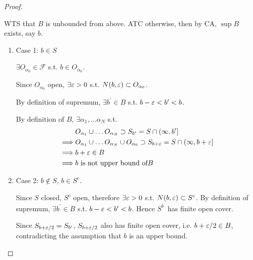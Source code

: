 \begin{proof}
\begin{enumerate}
        WTS that $B$ is unbounded from above. ATC otherwise, then by CA, 
        $\sup B$ exists, say $b$. 
        \begin{enumerate}
            \item Case 1: $b \in S$
            \medskip

            $\exists O_{\alpha_0} \in \mathcal{F}$ s.t. $b \in O_{\alpha_0}$. 
            \medskip 

            Since $O_{\alpha_0}$ open, $\exists \varepsilon > 0$ s.t. $N(b, \varepsilon) \subset O_{\alpha_0}$. 
            \medskip 

            By definition of supremum, $\exists b^{\prime} \in B$ s.t. $b - \varepsilon < b^{\prime} < b$. 
            \medskip 

            By definition of $B$, $\exists \alpha_1, \hdots \alpha_N$ s.t. 
            \begin{align*}
                & O_{\alpha_1} \cup \hdots O_{\alpha_N} \supset S_{b^{\prime}} = S \cap (\infty, b^{\prime}] \\
                \implies & O_{\alpha_1} \cup \hdots O_{\alpha_N} \cup O_{\alpha_0 } \supset S_{b + \varepsilon} = S \cap (\infty, b + \varepsilon] \\ 
                \implies & b + \varepsilon \in B \\
                \implies & b \text{ is not upper bound of} B
            \end{align*}

            \item Case 2: $b \notin S$, $b \in S^c$. 
            \medskip 

            Since $S$ closed, $S^c$ open, therefore $\exists \varepsilon > 0$ s.t. $N(b, \varepsilon) \subset S^c$. By definition of supremum, $\exists b^{\prime} \in B$ s.t. $b - \varepsilon < b^{\prime} < b$. Hence $S^{b^{\prime}}$ has finite open cover. 
            \medskip 

            Since $S_{b + \varepsilon / 2} = S_{b^{\prime}}$, $S_{b + \varepsilon /2}$ also has finite open cover, i.e. $b + \varepsilon / 2 \in B$, contradicting the assumption that $b$ is an upper bound.
        \end{enumerate}
    \end{enumerate}
\end{proof}


















